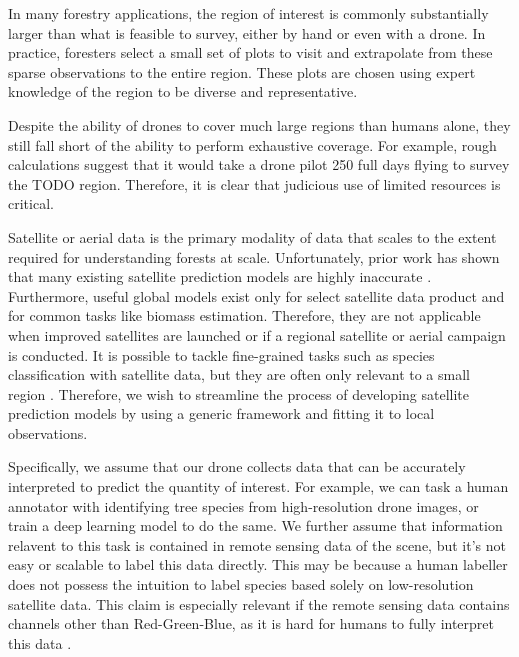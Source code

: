 In many forestry applications, the region of interest is commonly substantially larger than what is feasible to survey, either by hand or even with a drone. In practice, foresters  select a small set of plots to visit and extrapolate from these sparse observations to the entire region. These plots are chosen using expert knowledge of the region to be diverse and representative.

Despite the ability of drones to cover much large regions than humans alone, they still fall short of the ability to perform  exhaustive coverage. For example, rough calculations suggest that it would take a drone pilot 250 full days flying to survey the TODO region. Therefore, it is clear that judicious use of limited resources is critical.

Satellite or aerial data is the primary modality of data that scales to the extent required for understanding forests at scale. Unfortunately, prior work has shown that many existing satellite prediction models are highly inaccurate \cite{}. Furthermore, useful global models exist only for select satellite data product and for common tasks like biomass estimation. Therefore, they are not applicable when improved satellites are launched or if a regional satellite or aerial campaign is conducted.
It is possible to tackle fine-grained tasks such as species classification with satellite data, but they are often only relevant to a small region \cite{Sweden}. 
Therefore, we wish to streamline the process of developing satellite prediction models by using a generic framework and fitting it to local observations.

Specifically, we assume that our drone collects data that can be accurately interpreted to predict the quantity of interest. For example, we can task a human annotator with identifying tree species from high-resolution drone images, or train a deep learning model to do the same. We further assume that information relavent to this task is contained in remote sensing data of the scene, but it's not easy or scalable to label this data directly. This may be because a human labeller does not possess the intuition to label species based solely on low-resolution satellite data. This claim is especially relevant if the remote sensing data contains channels other than Red-Green-Blue, as it is hard for humans to fully interpret this data \cite{Hard to label multispectral}.

